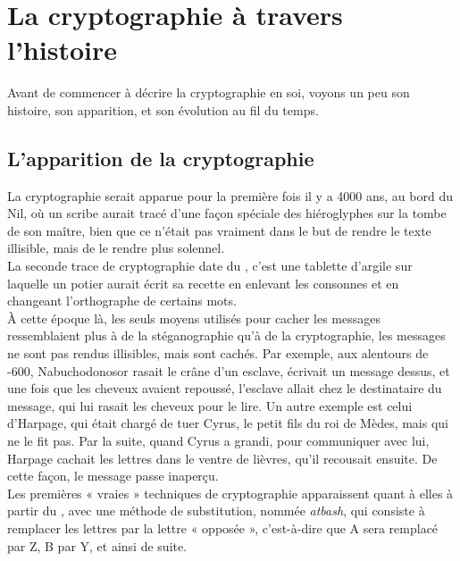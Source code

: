 \chapter{La cryptographie à travers l'histoire}
Avant de commencer à décrire la cryptographie en soi, voyons un peu
son histoire, son apparition, et son évolution au fil du temps.

\section{L'apparition de la cryptographie}
La cryptographie serait apparue pour la première fois il y a 4000 ans,
au bord du Nil, où un scribe aurait tracé d'une façon spéciale des
hiéroglyphes sur la tombe de son maître, bien que ce n'était pas
vraiment dans le but de rendre le texte illisible, mais de le rendre
plus solennel. \\

La seconde trace de cryptographie date du , c'est une tablette
d'argile sur laquelle un potier aurait écrit sa recette en enlevant
les consonnes et en changeant l'orthographe de certains mots. \\

À cette époque là, les seuls moyens utilisés pour cacher les messages
ressemblaient plus à de la stéganographie qu'à de la cryptographie,
les messages ne sont pas rendus illisibles, mais sont cachés. Par
exemple, aux alentours de -600, Nabuchodonosor rasait le crâne d'un
esclave, écrivait un message dessus, et une fois que les cheveux
avaient repoussé, l'esclave allait chez le destinataire du message,
qui lui rasait les cheveux pour le lire. Un autre exemple est celui
d'Harpage, qui était chargé de tuer Cyrus, le petit fils du roi de
Mèdes, mais qui ne le fit pas. Par la suite, quand Cyrus a grandi,
pour communiquer avec lui, Harpage cachait les lettres dans le ventre
de lièvres, qu'il recousait ensuite. De cette façon, le message passe
inaperçu. \\

Les premières « vraies » techniques de cryptographie apparaissent
quant à elles à partir du , avec une méthode de substitution,
nommée \emph{atbash}, qui consiste à remplacer les lettres par la
lettre « opposée », c'est-à-dire que A sera remplacé par Z, B par Y,
et ainsi de suite. \\

